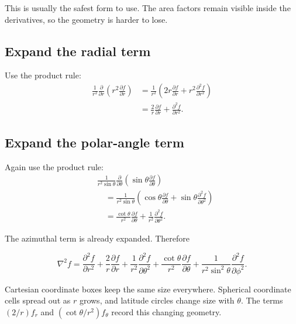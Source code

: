 \documentclass[11pt,a4paper]{article}
\begin{document}
This is usually the safest form to use. The area factors remain visible inside the derivatives, so the geometry is harder to lose.

\subsection{Expand the radial term}

Use the product rule:
\begin{align*}
  \frac{1}{r^2}\frac{\partial}{\partial r}
  \left(r^2\frac{\partial f}{\partial r}\right)
  &=
  \frac{1}{r^2}
  \left(
  2r\frac{\partial f}{\partial r}
  +r^2\frac{\partial^2 f}{\partial r^2}
  \right)\\
  &=
  \frac{2}{r}\frac{\partial f}{\partial r}
  +\frac{\partial^2 f}{\partial r^2}.
\end{align*}

\subsection{Expand the polar-angle term}

Again use the product rule:
\begin{align*}
  &\frac{1}{r^2\sin\theta}
  \frac{\partial}{\partial\theta}
  \left(\sin\theta\frac{\partial f}{\partial\theta}\right)\\
  &\quad=
  \frac{1}{r^2\sin\theta}
  \left(
  \cos\theta\frac{\partial f}{\partial\theta}
  +\sin\theta\frac{\partial^2f}{\partial\theta^2}
  \right)\\
  &\quad=
  \frac{\cot\theta}{r^2}\frac{\partial f}{\partial\theta}
  +\frac{1}{r^2}\frac{\partial^2f}{\partial\theta^2}.
\end{align*}

The azimuthal term is already expanded. Therefore
\begin{result}
\[
\boxed{
\nabla^2f
=\frac{\partial^2f}{\partial r^2}
+\frac{2}{r}\frac{\partial f}{\partial r}
+\frac{1}{r^2}\frac{\partial^2f}{\partial\theta^2}
+\frac{\cot\theta}{r^2}\frac{\partial f}{\partial\theta}
+\frac{1}{r^2\sin^2\theta}
 \frac{\partial^2f}{\partial\phi^2}.}
\]
\end{result}

\begin{idea}
Cartesian coordinate boxes keep the same size everywhere. Spherical coordinate cells spread out as \(r\) grows, and latitude circles change size with \(\theta\). The terms \((2/r)f_r\) and \((\cot\theta/r^2)f_\theta\) record this changing geometry.
\end{idea}
\end{document}
